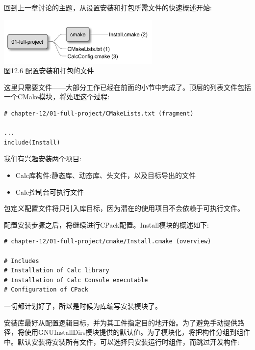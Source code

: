 
回到上一章讨论的主题，从设置安装和打包所需文件的快速概述开始:

\begin{center}
\includegraphics[width=0.6\textwidth]{content/3/chapter12/images/6.jpg}\\
图12.6 配置安装和打包的文件
\end{center}

这里只需要文件——大部分工作已经在前面的小节中完成了。顶层的列表文件包括一个CMake模块，将处理这个过程:

\begin{lstlisting}[style=styleCMake]
# chapter-12/01-full-project/CMakeLists.txt (fragment)

...
include(Install)
\end{lstlisting}

我们有兴趣安装两个项目:

\begin{itemize}
\item 
Calc库构件:静态库、动态库、头文件，以及目标导出的文件

\item 
Calc控制台可执行文件
\end{itemize}

包定义配置文件将只引入库目标，因为潜在的使用项目不会依赖于可执行文件。

配置安装步骤之后，将继续进行CPack配置。Install模块的概述如下:

\begin{lstlisting}[style=styleCMake]
# chapter-12/01-full-project/cmake/Install.cmake (overview)

# Includes
# Installation of Calc library
# Installation of Calc Console executable
# Configuration of CPack
\end{lstlisting}

一切都计划好了，所以是时候为库编写安装模块了。


安装库最好从配置逻辑目标，并为其工件指定目的地开始。为了避免手动提供路径，将使用GNUInstallDirs模块提供的默认值。为了模块化，将把构件分组到组件中。默认安装将安装所有文件，可以选择只安装运行时组件，而跳过开发构件:

